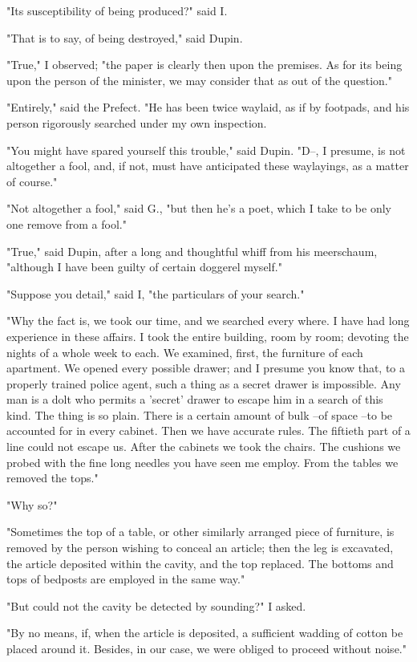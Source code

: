 \documentclass{article}
\begin{document}
"Its susceptibility of being produced?" said I.

"That is to say, of being destroyed," said Dupin.

"True," I observed; "the paper is clearly then upon the premises. As for its being upon the person of the minister, we may consider that as out of the question."

"Entirely," said the Prefect. "He has been twice waylaid, as if by footpads, and his person rigorously searched under my own inspection.

"You might have spared yourself this trouble," said Dupin. "D--, I presume, is not altogether a fool, and, if not, must have anticipated these waylayings, as a matter of course."

"Not altogether a fool," said G., "but then he's a poet, which I take to be only one remove from a fool."

"True," said Dupin, after a long and thoughtful whiff from his meerschaum, "although I have been guilty of certain doggerel myself."

"Suppose you detail," said I, "the particulars of your search."

"Why the fact is, we took our time, and we searched every where. I have had long experience in these affairs. I took the entire building, room by room; devoting the nights of a whole week to each. We examined, first, the furniture of each apartment. We opened every possible drawer; and I presume you know that, to a properly trained police agent, such a thing as a secret drawer is impossible. Any man is a dolt who permits a 'secret' drawer to escape him in a search of this kind. The thing is so plain. There is a certain amount of bulk --of space --to be accounted for in every cabinet. Then we have accurate rules. The fiftieth part of a line could not escape us. After the cabinets we took the chairs. The cushions we probed with the fine long needles you have seen me employ. From the tables we removed the tops."

"Why so?"

"Sometimes the top of a table, or other similarly arranged piece of furniture, is removed by the person wishing to conceal an article; then the leg is excavated, the article deposited within the cavity, and the top replaced. The bottoms and tops of bedposts are employed in the same way."

"But could not the cavity be detected by sounding?" I asked.

"By no means, if, when the article is deposited, a sufficient wadding of cotton be placed around it. Besides, in our case, we were obliged to proceed without noise."
\end{document}
